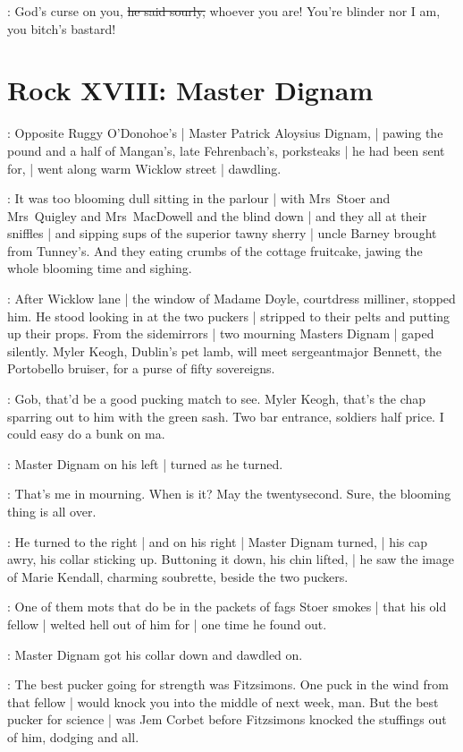 \stripling:
God's curse on you,
\sout{he said sourly,}
whoever you are!
You're blinder nor I am,%
you bitch's bastard!


\section*{Rock XVIII: Master Dignam}


:
Opposite Ruggy O'Donohoe's |
Master Patrick Aloysius Dignam, |
pawing the pound and a half
of Mangan's, late Fehrenbach's, porksteaks |
he had been sent for, |
went along warm Wicklow street |
dawdling.

\masterdignam:
It was too blooming dull sitting in the parlour |
with Mrs~Stoer and Mrs~Quigley and Mrs~MacDowell
and the blind down |
and they all at their sniffles |
and sipping sups of the superior tawny sherry |
uncle Barney brought from Tunney's.
And they eating crumbs of the cottage fruitcake,
jawing the whole blooming time and sighing.

:
After Wicklow lane |
the window of Madame Doyle,
courtdress milliner,
stopped him.
He stood looking in at the two puckers |
stripped to their pelts and putting up their props.
From the sidemirrors |
two mourning Masters Dignam |
gaped silently.
Myler Keogh,
Dublin's pet lamb,
will meet sergeant\-major Bennett,
the Porto\-bello bruiser,
for a purse of fifty sovereigns.

\masterdignam:
Gob, that'd be a good pucking match to see.
Myler Keogh, that's the chap sparring out to him with the green sash.
Two bar entrance, soldiers half price.
I could easy do a bunk on ma.

:
Master Dignam on his left |
turned as he turned.

\masterdignam:
That's me in mourning.
When is it?
May the twentysecond.
Sure, the blooming thing is all over.

:
He turned to the right |
and on his right |
Master Dignam turned, |
his cap awry,
his collar sticking up.
Buttoning it down,
his chin lifted, |
he saw the image of Marie Kendall,
charming soubrette,
beside the two puckers.

\masterdignam:
One of them mots that do be in the packets of fags Stoer smokes |
that his old fellow |
welted hell out of him for |
one time he found out.

:
Master Dignam got his collar down and dawdled on.

\masterdignam:
The best pucker
going for strength was Fitzsimons.
One puck in the wind from that fellow |
would knock you into the middle of next week, man.
But the best pucker for science |
was Jem Corbet
before Fitzsimons knocked the stuffings out of him,
dodging and all.

